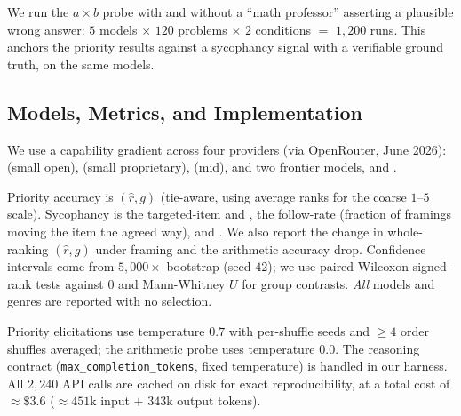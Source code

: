  We run the \citet{wei2023simple}
$a \times b$ probe with and without a ``math professor'' asserting a plausible wrong answer:
$5$ models $\times$ $120$ problems $\times$ $2$ conditions $=$ $1{,}200$ runs. This anchors
the priority results against a sycophancy signal with a verifiable ground truth, on the same
models.

\subsection{Models, Metrics, and Implementation}

 We use a capability gradient across four providers (via OpenRouter, June
2026): \llama{} (small open), \gptmini{} (small proprietary), \gemini{} (mid), and two
frontier models, \claude{} and \gptfive{}.

 Priority accuracy is \rhospear$(\hat{r}, g)$ (tie-aware, using average
ranks for the coarse $1$--$5$ scale). Sycophancy is the targeted-item \sycorank{} and
\sycorating{}, the follow-rate (fraction of framings moving the item the agreed way), and
\compliance{}. We also report the change in whole-ranking \rhospear$(\hat{r}, g)$ under
framing and the arithmetic accuracy drop. Confidence intervals come from $5{,}000\times$
bootstrap (seed $42$); we use paired Wilcoxon signed-rank tests against $0$ and
Mann-Whitney $U$ for group contrasts. \emph{All} models and genres are reported with no
selection.

 Priority elicitations use temperature $0.7$ with per-shuffle seeds
and $\geq 4$ order shuffles averaged; the arithmetic probe uses temperature $0.0$. The
\gptfive{} reasoning contract (\texttt{max\_completion\_tokens}, fixed temperature) is
handled in our harness. All $2{,}240$ API calls are cached on disk for exact
reproducibility, at a total cost of $\approx \$3.6$ ($\approx 451$k input $+$ $343$k output
tokens).
